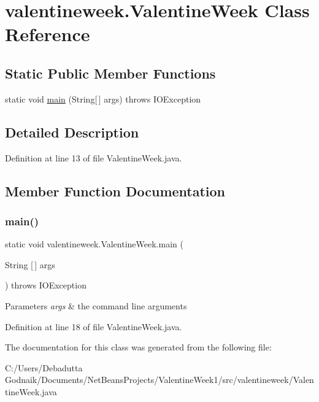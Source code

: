 \hypertarget{classvalentineweek_1_1_valentine_week}{}\section{valentineweek.\+Valentine\+Week Class Reference}
\label{classvalentineweek_1_1_valentine_week}
\subsection*{Static Public Member Functions}
\begin{DoxyCompactItemize}
\item 
static void \hyperlink{classvalentineweek_1_1_valentine_week_ad9d642ebf45f84508fac79154e2fe67a}{main} (String\mbox{[}$\,$\mbox{]} args)  throws I\+O\+Exception
\end{DoxyCompactItemize}


\subsection{Detailed Description}


Definition at line 13 of file Valentine\+Week.\+java.



\subsection{Member Function Documentation}
\mbox{\label{classvalentineweek_1_1_valentine_week_ad9d642ebf45f84508fac79154e2fe67a}} 
\subsubsection{\texorpdfstring{main()}{main()}}
{\footnotesize\ttfamily static void valentineweek.\+Valentine\+Week.\+main (\begin{DoxyParamCaption}\item[{String \mbox{[}$\,$\mbox{]}}]{args }\end{DoxyParamCaption}) throws I\+O\+Exception\hspace{0.3cm}{\ttfamily [static]}}


\begin{DoxyParams}{Parameters}
{\em args} & the command line arguments \\
\hline
\end{DoxyParams}


Definition at line 18 of file Valentine\+Week.\+java.



The documentation for this class was generated from the following file\+:\begin{DoxyCompactItemize}
\item 
C\+:/\+Users/\+Debadutta Godnaik/\+Documents/\+Net\+Beans\+Projects/\+Valentine\+Week1/src/valentineweek/Valentine\+Week.\+java\end{DoxyCompactItemize}
